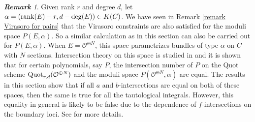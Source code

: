\documentclass[11pt]{amsart}
\theoremstyle{remark}
\newtheorem{remark}[theorem]{\bf Remark}
\renewcommand{\O}{\mathcal{O}}
\newcommand{\rk}{\textnormal{rank}}
\newcommand{\quot}[0]{\textnormal{Quot}}
\numberwithin{theorem}{section}
\begin{document}
\vspace{.cm}

\begin{remark}\label{remark intersection theory on pairs}
    Given rank $r$ and degree $d$, let $\alpha=(\rk(E)-r,d-\deg(E)) \in K(C)$.
    We have seen in Remark \ref{remark Virasoro for pairs} that
    the Virasoro constraints are also satisfied for the moduli space $P(E,\alpha)$.
    So a similar calculation as in this section can also be carried out for $P(E,\alpha)$.
    When $E= \O^{\oplus N}$, this space parametrizes bundles
    of type $\alpha$ on $C$ with $N$ sections. 
    Intersection theory on this space is studied in \cite{Mar07}
    and it is shown that for certain polynomials, say $P$,
    the intersection number of $P$ on 
    the Quot scheme $\quot_{r,d}(\O^{\oplus N})$
    and the moduli space $P(\O^{\oplus N},\alpha)$ are equal.
    The results in this section show that if all $a$ and $b$-intersections are equal on both of these spaces, 
    then the same is true for all the tautological integrals.
    However, this equality in general is likely to be false
    due to the dependence of $f$-intersections on the boundary loci.
    See \cite{Mar07} for more details.
\end{remark}
\end{document}
